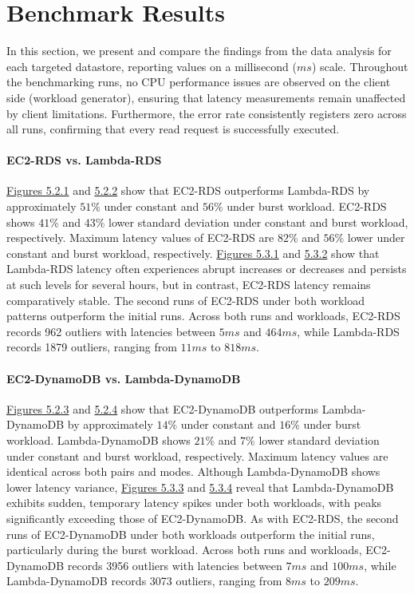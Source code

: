 \section{Benchmark Results}
\label{cha:results}

In this section, we present and compare the findings from the data analysis for each targeted datastore, reporting values on a millisecond ($ms$) scale. Throughout the benchmarking runs, no CPU performance issues are observed on the client side (workload generator), ensuring that latency measurements remain unaffected by client limitations. Furthermore, the error rate consistently registers zero across all runs, confirming that every read request is successfully executed.

\paragraph*{EC2-RDS vs. Lambda-RDS}
\hyperref[fig:bar_rds_const]{Figures 5.2.1} and \hyperref[fig:bar_rds_bursty]{5.2.2} show that EC2-RDS outperforms Lambda-RDS by approximately $51\%$ under constant and $56\%$ under burst workload. EC2-RDS shows $41\%$ and $43\%$ lower standard deviation under constant and burst workload, respectively. Maximum latency values of EC2-RDS are $82\%$ and $56\%$ lower under constant and burst workload, respectively.
%
\hyperref[fig:ts_rds_const]{Figures 5.3.1} and \hyperref[fig:ts_rds_bursty]{5.3.2} show that Lambda-RDS latency often experiences abrupt increases or decreases and persists at such levels for several hours, but in contrast, EC2-RDS latency remains comparatively stable. The second runs of EC2-RDS under both workload patterns outperform the initial runs.
%
Across both runs and workloads, EC2-RDS records 962 outliers with latencies between $5ms$ and $464ms$, while Lambda-RDS records 1879 outliers, ranging from $11ms$ to $818ms$.


\paragraph*{EC2-DynamoDB vs. Lambda-DynamoDB}
\hyperref[fig:bar_ddb_const]{Figures 5.2.3} and \hyperref[fig:bar_ddb_bursty]{5.2.4} show that EC2-DynamoDB outperforms Lambda-DynamoDB by approximately $14\%$ under constant and $16\%$ under burst workload. Lambda-DynamoDB shows $21\%$ and $7\%$ lower standard deviation under constant and burst workload, respectively. Maximum latency values are identical across both pairs and modes.
%
Although Lambda-DynamoDB shows lower latency variance, \hyperref[fig:ts_ddb_const]{Figures 5.3.3} and \hyperref[fig:ts_ddb_bursty]{5.3.4} reveal that Lambda-DynamoDB exhibits sudden, temporary latency spikes under both workloads, with peaks significantly exceeding those of EC2-DynamoDB. As with EC2-RDS, the second runs of EC2-DynamoDB under both workloads outperform the initial runs, particularly during the burst workload.
%
Across both runs and workloads, EC2-DynamoDB records 3956 outliers with latencies between $7ms$ and $100ms$, while Lambda-DynamoDB records 3073 outliers, ranging from $8ms$ to $209ms$.

